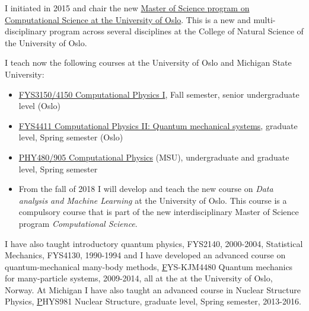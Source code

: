 \documentclass[a4wide,10pt]{article}
\begin{document}
I initiated in 2015 and chair the new \href{{http://www.uio.no/english/studies/programmes/computational-science-master/}}{Master of Science program on Computational Science at the University of Oslo}. This is a new and multi-disciplinary program across several disciplines at the College of Natural Science of the University of Oslo. 

I teach now the following courses at the University of Oslo and Michigan State University:

\begin{itemize}
\item \href{{http://www.uio.no/studier/emner/matnat/fys/FYS3150/}}{FYS3150/4150 Computational Physics I}, Fall semester, senior undergraduate level (Oslo) 

\item \href{{http://www.uio.no/studier/emner/matnat/fys/FYS4411/}}{FYS4411 Computational Physics II: Quantum mechanical systems}, graduate level, Spring semester (Oslo) 

\item \href{{https://github.com/CompPhysics/ComputationalPhysicsMSU}}{PHY480/905 Computational Physics} (MSU), undergraduate and graduate level, Spring semester

\item From the fall of 2018 I will develop and teach the new course on {\em Data analysis and Machine Learning} at the University of Oslo. This course is a compulsory course that is part of the new interdisciplinary Master of Science program {\em Computational Science}. 


\end{itemize}



I have also taught introductory quantum physics, FYS2140, 2000-2004, Statistical Mechanics, FYS4130, 1990-1994 and I have developed an advanced course on quantum-mechanical many-body methods, \href{http://www.uio.no/studier/emner/matnat/fys/FYS-kjm4480/} FYS-KJM4480 Quantum mechanics for many-particle systems, 2009-2014, all at the at the University of Oslo, Norway. At Michigan I have also taught an advanced course in Nuclear Structure Physics, \href{https://github.com/NuclearStructure/PHY981} PHYS981 Nuclear Structure, graduate level, Spring semester, 2013-2016. 
\end{document}
